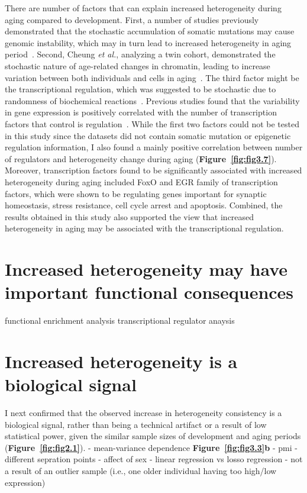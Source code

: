 There are number of factors that can explain increased heterogeneity during aging compared to development.
First, a number of studies previously demonstrated that the stochastic accumulation of somatic mutations may cause genomic instability,
which may in turn lead to increased heterogeneity in aging period~\cite{Lu2004, Vijg2004, Lodato2018, Lombard2005}.
Second, Cheung \textit{et al.}, analyzing a twin cohort, demonstrated the stochastic nature of age-related changes in chromatin,
leading to increase variation between both individuals and cells in aging~\cite{Cheung2018}.
The third factor might be the transcriptional regulation, which was suggested to be stochastic due to randomness of biochemical reactions~\cite{Maheshri2007, Barroso2018}.
Previous studies found that the variability in gene expression is positively correlated with the number of transcription factors that control is regulation~\cite{Barroso2018, Sharon2014}.
While the first two factors could not be tested in this study since the datasets did not contain somatic mutation or epigenetic regulation information, 
I also found a mainly positive correlation between number of regulators and heterogeneity change during aging (\textbf{Figure~\ref{fig:fig3.7}}).
Moreover, transcription factors found to be significantly associated with increased heterogeneity during aging included FoxO and EGR family of transcription factors, 
which were shown to be regulating genes important for synaptic homeostasis, stress resistance, cell cycle arrest and apoptosis.
Combined, the results obtained in this study also supported the view that increased heterogeneity in aging may be associated with the transcriptional regulation.

\section{Increased heterogeneity may have important functional consequences}
functional enrichment analysis
transcriptional regulator anaysis

\section{Increased heterogeneity is a biological signal}
I next confirmed that the observed increase in heterogeneity consistency is a biological signal, rather than being a technical artifact or a result of low statistical power, 
given the similar sample sizes of development and aging periods (\textbf{Figure~\ref{fig:fig2.1}}).
- mean-variance dependence \textbf{Figure~\ref{fig:fig3.3}b}
- pmi 
- different sepration points
- affect of sex
- linear regression vs losso regression
- not a result of an outlier sample (i.e., one older individual having too high/low expression)


